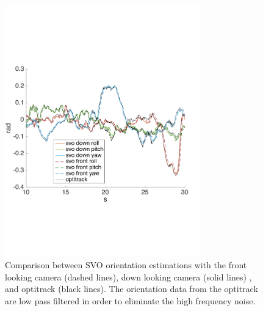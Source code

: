 \begin{figure}[!ht]
    \centering
    \includegraphics[width=0.75\textwidth]{img/comparision_between_two_svo_and_opti_angles.pdf}
    \caption{Comparison between SVO orientation estimations with the front looking camera (dashed lines), down looking camera (solid lines) , and optitrack (black lines). The orientation data from the optitrack are low pass filtered in order to eliminate the high frequency noise. }
    \label{fig:comparision_svo_angles}
\end{figure}

